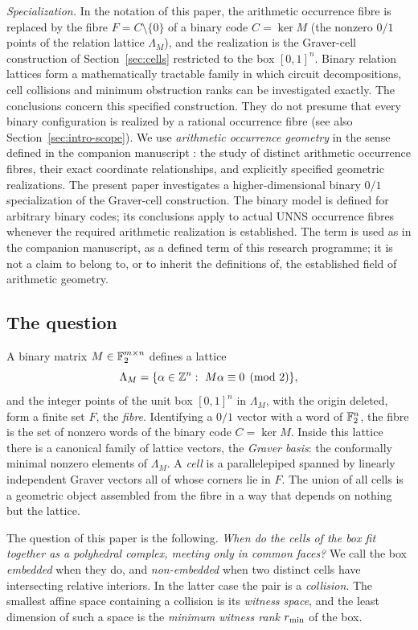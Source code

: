 \emph{Specialization.} In the notation of this paper, the arithmetic occurrence fibre is replaced by the fibre $F=C\setminus\{0\}$ of a binary code $C=\ker M$ (the nonzero $0/1$ points of the relation lattice $\Lambda_M$), and the realization is the Graver-cell construction of Section~\ref{sec:cells} restricted to the box $[0,1]^n$. Binary relation lattices form a mathematically tractable family in which circuit decompositions, cell collisions and minimum obstruction ranks can be investigated exactly. The conclusions concern this specified construction. They do not presume that every binary configuration is realized by a rational occurrence fibre (see also Section~\ref{sec:intro-scope}). We use \emph{arithmetic occurrence geometry} in the sense defined in the companion manuscript \cite{PaperA}: the study of distinct arithmetic occurrence fibres, their exact coordinate relationships, and explicitly specified geometric realizations. The present paper investigates a higher-dimensional binary $0/1$ specialization of the Graver-cell construction. The binary model is defined for arbitrary binary codes; its conclusions apply to actual UNNS occurrence fibres whenever the required arithmetic realization is established. The term is used as in the companion manuscript, as a defined term of this research programme; it is not a claim to belong to, or to inherit the definitions of, the established field of arithmetic geometry.

\subsection{The question}

A binary matrix $M\in\mathbb F_2^{m\times n}$ defines a lattice
\[
\Lambda_M=\{\alpha\in\mathbb Z^n:\ M\alpha\equiv 0 \pmod 2\},
\]
and the integer points of the unit box $[0,1]^n$ in $\Lambda_M$, with the origin deleted, form a finite set $F$, the \emph{fibre}. Identifying a $0/1$ vector with a word of $\mathbb F_2^n$, the fibre is the set of nonzero words of the binary code $C=\ker M$. Inside this lattice there is a canonical family of lattice vectors, the \emph{Graver basis}: the conformally minimal nonzero elements of $\Lambda_M$. A \emph{cell} is a parallelepiped spanned by linearly independent Graver vectors all of whose corners lie in $F$. The union of all cells is a geometric object assembled from the fibre in a way that depends on nothing but the lattice.

The question of this paper is the following. \emph{When do the cells of the box fit together as a polyhedral complex, meeting only in common faces?} We call the box \emph{embedded} when they do, and \emph{non-embedded} when two distinct cells have intersecting relative interiors. In the latter case the pair is a \emph{collision}. The smallest affine space containing a collision is its \emph{witness space}, and the least dimension of such a space is the \emph{minimum witness rank} $r_{\min}$ of the box.

